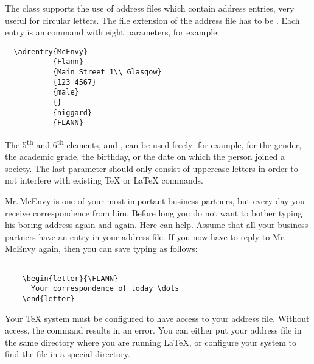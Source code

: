 %
\begin{Declaration}
\end{Declaration}%
\label{decl:adrentry}

The class  supports the use of address files which
contain address entries, very useful for circular letters. The file
extension of the address file has to be . Each entry is an
 command with eight parameters, for example:
\begin{lstlisting}
  \adrentry{McEnvy}
           {Flann}
           {Main Street 1\\ Glasgow}
           {123 4567}
           {male}
           {}
           {niggard}
           {FLANN}
\end{lstlisting}
The 5\textsuperscript{th} and 6\textsuperscript{th} elements,
 and , can be used freely: for example, for the
gender, the academic grade, the birthday, or the date on which the
person joined a society.  The last parameter  should only
consist of uppercase letters in order to not interfere with existing
{\TeX} or {\LaTeX} commands.

\begin{Example}
  Mr.\,McEnvy is one of your most important business partners, but
  every day you receive correspondence from him.  Before long you do
  not want to bother typing his boring address again and again.  Here
   can help.  Assume that all your business partners
  have an entry in your  address file.  If you now
  have to reply to Mr.\,McEnvy again, then you can save typing as
  follows:
  \begin{lstlisting}
    
    \begin{letter}{\FLANN}
      Your correspondence of today \dots
    \end{letter}
  \end{lstlisting}
  Your {\TeX} system must be configured to have access to your address
  file. Without access, the  command results in an
  error. You can either put your address file in the same directory
  where you are running {\LaTeX}, or configure your system to find the
  file in a special directory.
\end{Example}
% 

